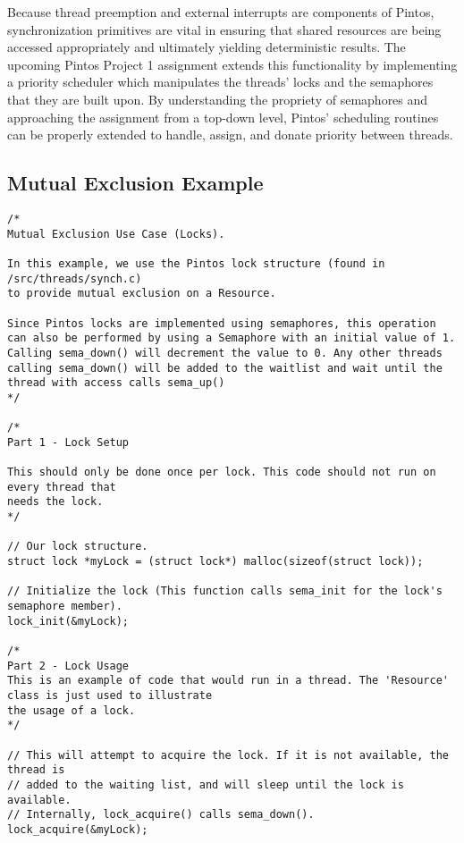 \documentclass[11pt, letterpaper]{article}
\begin{document}
Because thread preemption and external interrupts are components of Pintos, synchronization primitives are vital in ensuring that shared resources are being accessed appropriately and ultimately yielding deterministic results. The upcoming Pintos Project 1 assignment extends this functionality by implementing a priority scheduler which manipulates the threads’ locks and the semaphores that they are built upon. By understanding the propriety of semaphores and approaching the assignment from a top-down level, Pintos’ scheduling routines can be properly extended to handle, assign, and donate priority between threads.

\pagebreak
\begin{appendices}

\section{Mutual Exclusion Example}
\begin{lstlisting}[frame=single,basicstyle=\footnotesize]
/*
Mutual Exclusion Use Case (Locks).

In this example, we use the Pintos lock structure (found in /src/threads/synch.c)
to provide mutual exclusion on a Resource.

Since Pintos locks are implemented using semaphores, this operation can also be performed by using a Semaphore with an initial value of 1. Calling sema_down() will decrement the value to 0. Any other threads calling sema_down() will be added to the waitlist and wait until the thread with access calls sema_up()
*/

/*
Part 1 - Lock Setup

This should only be done once per lock. This code should not run on every thread that
needs the lock.
*/

// Our lock structure.
struct lock *myLock = (struct lock*) malloc(sizeof(struct lock));

// Initialize the lock (This function calls sema_init for the lock's semaphore member).
lock_init(&myLock);

/*
Part 2 - Lock Usage
This is an example of code that would run in a thread. The 'Resource' class is just used to illustrate
the usage of a lock.
*/

// This will attempt to acquire the lock. If it is not available, the thread is
// added to the waiting list, and will sleep until the lock is available.
// Internally, lock_acquire() calls sema_down(). 
lock_acquire(&myLock);


\end{lstlisting}
\end{appendices}
\end{document}
